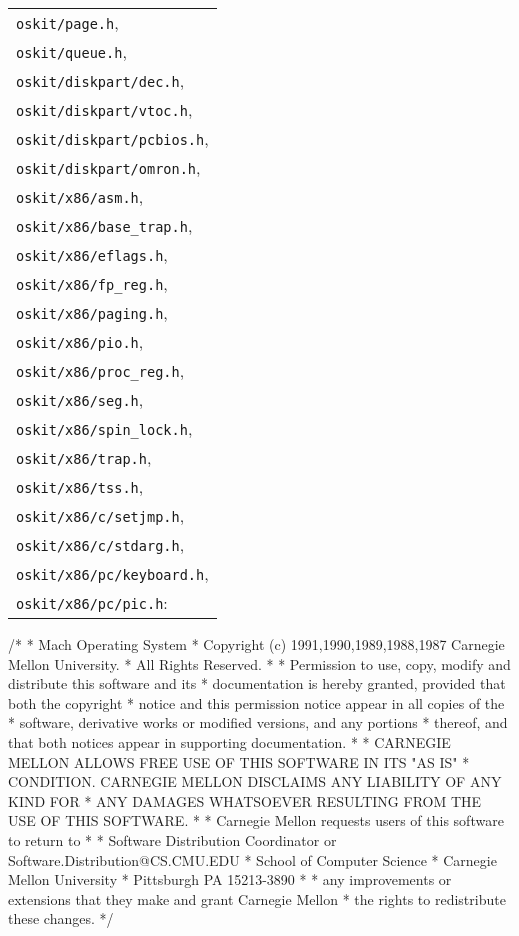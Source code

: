 \begin{tabular}{l}
\texttt{oskit/\-page.h},  \\
\texttt{oskit/\-queue.h},  \\
\texttt{oskit/\-diskpart/\-dec.h},  \\
\texttt{oskit/\-diskpart/\-vtoc.h},  \\
\texttt{oskit/\-diskpart/\-pcbios.h},  \\
\texttt{oskit/\-diskpart/\-omron.h},  \\
\texttt{oskit/\-x86/\-asm.h},  \\
\texttt{oskit/\-x86/\-base_trap.h},  \\
\texttt{oskit/\-x86/\-eflags.h},  \\
\texttt{oskit/\-x86/\-fp_reg.h},  \\
\texttt{oskit/\-x86/\-paging.h},  \\
\texttt{oskit/\-x86/\-pio.h},  \\
\texttt{oskit/\-x86/\-proc_reg.h},  \\
\texttt{oskit/\-x86/\-seg.h},  \\
\texttt{oskit/\-x86/\-spin_lock.h},  \\
\texttt{oskit/\-x86/\-trap.h},  \\
\texttt{oskit/\-x86/\-tss.h},  \\
\texttt{oskit/\-x86/\-c/\-setjmp.h},  \\
\texttt{oskit/\-x86/\-c/\-stdarg.h},  \\
\texttt{oskit/\-x86/\-pc/\-keyboard.h},  \\
\texttt{oskit/\-x86/\-pc/\-pic.h}:  \\
\end{tabular}

\begin{copyrightEnv}
/*
 * Mach Operating System
 * Copyright (c) 1991,1990,1989,1988,1987 Carnegie Mellon University.
 * All Rights Reserved.
 *
 * Permission to use, copy, modify and distribute this software and its
 * documentation is hereby granted, provided that both the copyright
 * notice and this permission notice appear in all copies of the
 * software, derivative works or modified versions, and any portions
 * thereof, and that both notices appear in supporting documentation.
 *
 * CARNEGIE MELLON ALLOWS FREE USE OF THIS SOFTWARE IN ITS "AS IS"
 * CONDITION.  CARNEGIE MELLON DISCLAIMS ANY LIABILITY OF ANY KIND FOR
 * ANY DAMAGES WHATSOEVER RESULTING FROM THE USE OF THIS SOFTWARE.
 *
 * Carnegie Mellon requests users of this software to return to
 *
 *  Software Distribution Coordinator  or  Software.Distribution@CS.CMU.EDU
 *  School of Computer Science
 *  Carnegie Mellon University
 *  Pittsburgh PA 15213-3890
 *
 * any improvements or extensions that they make and grant Carnegie Mellon
 * the rights to redistribute these changes.
 */
\end{copyrightEnv}

